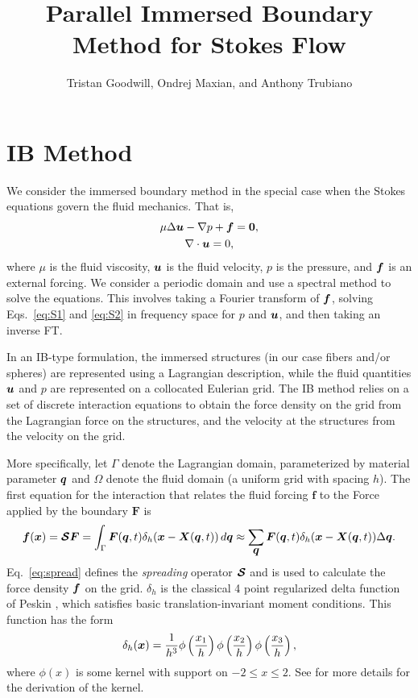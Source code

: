 \documentclass[]{article}
\title{Parallel Immersed Boundary Method for Stokes Flow}
\author{Tristan Goodwill, Ondrej Maxian, and Anthony Trubiano}
\newcommand{\bm}[1]{\mbox{\boldmath $ #1 $}}    %
\renewcommand{\vec}[1]{\bm{#1}}                 %
\begin{document}
\maketitle

\section{IB Method}
We consider the immersed boundary method in the special case when the Stokes equations govern the fluid mechanics. That is, 
\begin{gather}
\label{eq:S1}
\mu \Delta \bm{u} - \nabla p + \bm{f} = \bm{0}, \\
\label{eq:S2}
\nabla \cdot \bm{u} = 0,
\end{gather}
where $\mu$ is the fluid viscosity, $\vec{u}$ is the fluid velocity, $p$ is the pressure, and $\vec{f}$ is an external forcing. We consider a periodic domain and use a spectral method to solve the equations. This involves taking a Fourier transform of $\bm{f}$, solving Eqs.\ \eqref{eq:S1} and \eqref{eq:S2} in frequency space for $p$ and $\bm{u}$, and then taking an inverse FT. 

In an IB-type formulation, the immersed structures (in our case fibers and/or spheres) are represented using a Lagrangian description, while the fluid quantities $\bm{u}$ and $p$ are represented on a collocated Eulerian grid. The IB method relies on a set of discrete interaction equations to obtain the force density on the grid from the Lagrangian force on the structures, and the velocity at the structures from the velocity on the grid. 

More specifically, let $\Gamma$ denote the Lagrangian domain, parameterized by material parameter $\bm{q}$ and $\Omega$ denote the fluid domain (a uniform grid with spacing $h$). The first equation for the interaction that relates the fluid forcing $\boldsymbol{f}$ to the Force applied by the boundary $\boldsymbol{F}$ is
\begin{equation}
\label{eq:spread}
\bm{f}(\bm{x}) = \bm{\mathcal{S}} \bm{F}  = \int_{\Gamma}  \bm{F}(\bm{q},t) \delta_h (\bm{x} - \bm{X}(\bm{q},t))\, d \bm{q}  \approx \sum_{\bm{q}} \bm{F}(\bm{q},t) \delta_h (\bm{x} - \bm{X}(\bm{q},t)) \Delta \bm{q}. 
\end{equation}
Eq.\ \eqref{eq:spread} defines the \textit{spreading} operator $\bm{\mathcal{S}}$ and is used to calculate the force density $\bm{f}$ on the grid. $\delta_h$ is the classical 4 point regularized delta function of Peskin \cite{peskin2002acta}, which satisfies basic translation-invariant moment conditions. This function has the form
\begin{equation}
\delta_h(\bm{x}) = \frac{1}{h^3} \phi\left(\frac{x_1}{h}\right) \phi\left(\frac{x_2}{h}\right) \phi\left(\frac{x_3}{h}\right), 
\end{equation}
where $\phi(x)$ is some kernel with support on $-2 \leq x \leq 2$. See \cite{peskin2002acta} for more details for the derivation of the kernel. 
\end{document}

